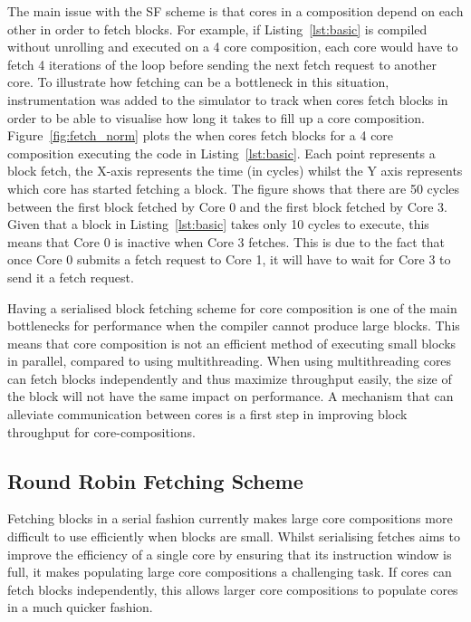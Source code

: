 The main issue with the SF scheme is that cores in a composition depend on each other in order to fetch blocks.
For example, if Listing~\ref{lst:basic} is compiled without unrolling and executed on a 4 core composition, each core would have to fetch 4 iterations of the loop before sending the next fetch request to another core.
To illustrate how fetching can be a bottleneck in this situation, instrumentation was added to the simulator to track when cores fetch blocks in order to be able to visualise how long it takes to fill up a core composition.
Figure~\ref{fig:fetch_norm} plots the when cores fetch blocks for a 4 core composition executing the code in Listing~\ref{lst:basic}.
Each point represents a block fetch, the X-axis represents the time (in cycles) whilst the Y axis represents which core has started fetching a block.
The figure shows that there are 50 cycles between the first block fetched by Core 0 and the first block fetched by Core 3.
Given that a block in Listing~\ref{lst:basic} takes only 10 cycles to execute, this means that Core 0 is inactive when Core 3 fetches.
This is due to the fact that once Core 0 submits a fetch request to Core 1, it will have to wait for Core 3 to send it a fetch request.

Having a serialised block fetching scheme for core composition is one of the main bottlenecks for performance when the compiler cannot produce large blocks.
This means that core composition is not an efficient method of executing small blocks in parallel, compared to using multithreading.
When using multithreading cores can fetch blocks independently and thus maximize throughput easily, the size of the block will not have the same impact on performance.
A mechanism that can alleviate communication between cores is a first step in improving block throughput for core-compositions.

\subsection{Round Robin Fetching Scheme}

Fetching blocks in a serial fashion currently makes large core compositions more difficult to use efficiently when blocks are small.
Whilst serialising fetches aims to improve the efficiency of a single core by ensuring that its instruction window is full, it makes populating large core compositions a challenging task.
If cores can fetch blocks independently, this allows larger core compositions to populate cores in a much quicker fashion.

